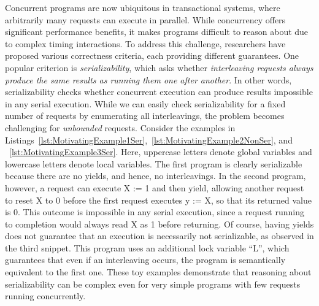 Concurrent programs are now ubiquitous in transactional systems, where arbitrarily many requests can execute in parallel.
While concurrency offers significant performance benefits, it makes programs difficult to reason about due to complex timing interactions.
%
To address this challenge, researchers have proposed various correctness criteria, each providing different guarantees.
One popular criterion is \textit{serializability}, which asks whether \textit{interleaving requests always produce the same results as running them one after another}. In other words, serializability checks whether concurrent execution can produce results impossible in any serial execution.
%
While we can easily check serializability for a fixed number of requests by enumerating all interleavings, the problem becomes challenging for \textit{unbounded} requests. Consider the examples in Listings~\ref{lst:MotivatingExample1Ser},~\ref{lst:MotivatingExample2NonSer}, and ~\ref{lst:MotivatingExample3Ser}. Here, uppercase letters denote global variables and lowercase letters denote local variables.
%
The first program is clearly serializable because there are no yields, and hence, no interleavings. In the second program, however, a request can execute X := 1 and then yield, allowing another request to reset X to 0 before the first request executes y := X, so that its returned value is 0. This outcome is impossible in any serial execution, since a request running to completion would always read X as 1 before returning.
Of course, having yields does not guarantee that an execution is necessarily not serializable, as observed in the third snippet. This program uses an additional lock variable ``L'', which guarantees that even if an interleaving occurs, the program is semantically equivalent to the first one.
%
These toy examples demonstrate that reasoning about serializability can be complex even for very simple programs with few requests running concurrently.
%


